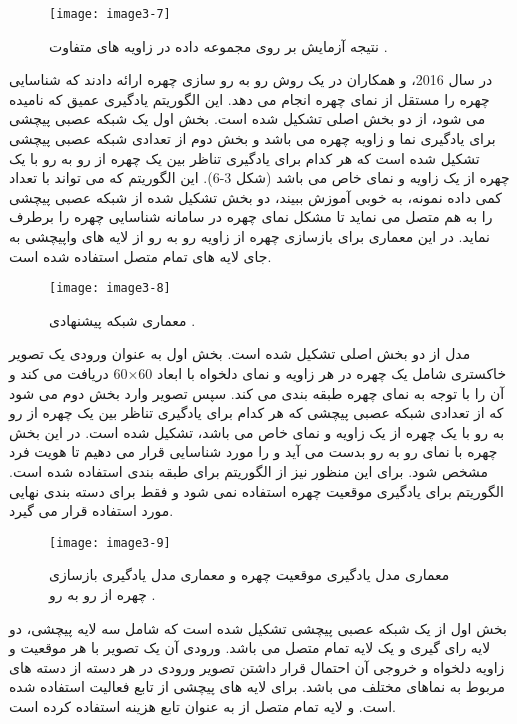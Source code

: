  \begin{figure}[h]
\centering
  \texttt{[image: image3-7]}
  \caption{نتیجه آزمایش بر روی مجموعه داده   در زاویه های متفاوت \cite{ref1}.}
  \label{image2-1}
\end{figure}
\noindent
در سال 2016،  و همکاران در \cite{7532959} یک روش رو به رو سازی چهره ارائه دادند که شناسایی چهره را مستقل از نمای چهره  انجام می دهد. این الگوریتم یادگیری عمیق که  نامیده می شود، از دو بخش اصلی تشکیل شده است. بخش اول یک شبکه عصبی پیچشی برای یادگیری نما و زاویه چهره می باشد و بخش دوم از تعدادی شبکه عصبی پیچشی تشکیل شده است که هر کدام برای یادگیری تناظر  بین یک چهره از رو به رو با یک چهره از یک زاویه و نمای خاص می باشد (شکل 3-6). این الگوریتم که می تواند با تعداد کمی داده نمونه، به خوبی آموزش ببیند، دو بخش تشکیل شده از شبکه عصبی پیچشی را به هم متصل می نماید تا مشکل نمای چهره در سامانه شناسایی چهره را برطرف نماید. در این معماری برای بازسازی چهره از زاویه رو به رو از لایه های واپیچشی  به جای لایه های تمام متصل استفاده شده است.
\begin{figure}[h]
\centering
  \texttt{[image: image3-8]}
  \caption{معماری شبکه پیشنهادی   \cite{ref1}.}
  \label{image2-1}
\end{figure}
\noindent
مدل  از دو بخش اصلی تشکیل شده است. بخش اول به عنوان ورودی یک تصویر خاکستری  شامل یک چهره در هر زاویه و نمای دلخواه با ابعاد 60×60 دریافت می کند و آن را با توجه به نمای چهره طبقه بندی  می کند. سپس تصویر وارد بخش دوم می شود که از تعدادی شبکه عصبی پیچشی که هر کدام برای یادگیری تناظر  بین یک چهره از رو به رو با یک چهره از یک زاویه و نمای خاص می باشد، تشکیل شده است. در این بخش چهره با نمای رو به رو بدست می آید و را مورد شناسایی قرار می دهیم تا هویت فرد مشخص شود. برای این منظور نیز از الگوریتم   برای طبقه بندی استفاده شده است. الگوریتم  برای یادگیری موقعیت چهره استفاده نمی شود و فقط برای دسته بندی نهایی مورد استفاده قرار می گیرد.
 \begin{figure}[h]
\centering
  \texttt{[image: image3-9]}
  \caption{ معماری مدل یادگیری موقعیت چهره و  معماری مدل یادگیری بازسازی چهره از رو به رو \cite{ref1}.}
  \label{image2-1}
\end{figure}
\noindent
بخش اول از یک شبکه عصبی پیچشی تشکیل شده است که شامل سه لایه پیچشی، دو لایه رای گیری و یک لایه تمام متصل می باشد. ورودی آن یک تصویر با هر موقعیت و زاویه دلخواه و خروجی آن احتمال قرار داشتن تصویر ورودی در هر دسته از دسته های مربوط به نماهای مختلف می باشد. برای لایه های پیچشی از تابع فعالیت  استفاده شده است. و لایه تمام متصل از  به عنوان تابع هزینه استفاده کرده است.
